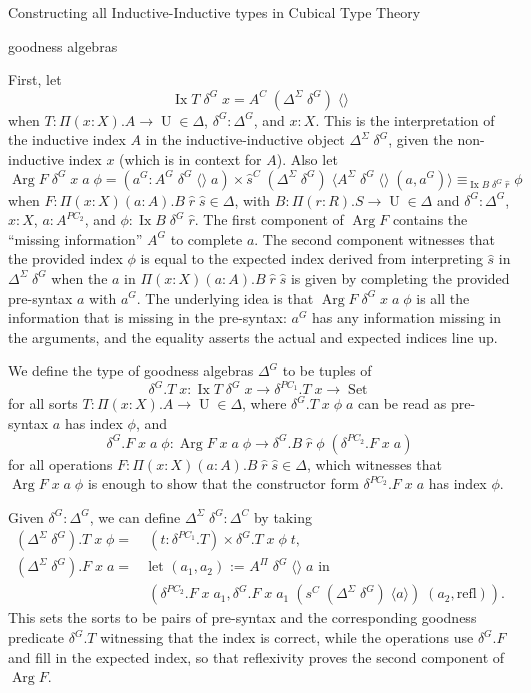 \documentclass[acmsmall,review]{acmart}\settopmatter{printfolios=true,printccs=false,printacmref=false}
\DeclareMathOperator{\USet}{Set}
\DeclareMathOperator{\UU}{U}
\DeclareMathOperator{\Arg}{Arg}
\DeclareMathOperator{\Ix}{Ix}
\newcommand{\IdA}[3]{{#1}\equiv_{#3}{#2}}
\def\emptytuple{\langle\rangle}
\begin{document}
\begin{section}{Constructing all Inductive-Inductive types in Cubical Type Theory}
\begin{subsection}{goodness algebras}
\begin{definition}
First, let \[\Ix T\;\delta^G\;x = A^C\;(\Delta^{\Sigma}\;\delta^G)\;\emptytuple\] when $T : \Pi(x : X).A \to \UU \in \Delta$, $\delta^G : \Delta^G$, and $x : X$. This is the interpretation of the inductive index $A$ in the inductive-inductive object $\Delta^\Sigma\;\delta^G$, given the non-inductive index $x$ (which is in context for $A$).
Also let \[\Arg F\;\delta^G\;x\;a\;\phi = (a^G : A^G\;\delta^G\;\emptytuple\;a)\times\IdA{\hat{s}^C\;(\Delta^{\Sigma}\;\delta^G)\;\langle A^{\Sigma}\;\delta^G\;\emptytuple\;(a,a^G)\rangle}{\phi}{\Ix B\;\delta^G\;\hat{r}}\] when $F : \Pi(x : X)(a:A).B\;\hat{r}\;\hat{s} \in \Delta$, with $B : \Pi(r : R).S\to\UU\in\Delta$ and $\delta^G : \Delta^G$, $x : X$, $a : A^{PC_2}$, and $\phi : \Ix B\;\delta^G\;\hat{r}$. The first component of $\Arg F$ contains the ``missing information'' $A^G$ to complete $a$. The second component witnesses that the provided index $\phi$ is equal to the expected index derived from interpreting $\hat{s}$ in $\Delta^\Sigma\;\delta^G$ when the $a$ in $\Pi(x : X)(a : A).B\;\hat{r}\;\hat{s}$ is given by completing the provided pre-syntax $a$ with $a^G$. The underlying idea is that $\Arg F\;\delta^G\;x\;a\;\phi$ is all the information that is missing in the pre-syntax: $a^G$ has any information missing in the arguments, and the equality asserts the actual and expected indices line up.

We define the type of goodness algebras $\Delta^G$ to be tuples of \[\delta^G.T\;x : \Ix T\;\delta^G\;x \to \delta^{PC_1}.T\;x \to \USet\] for all sorts $T : \Pi(x : X).A \to \UU \in \Delta$, where $\delta^G.T\;x\;\phi\;a$ can be read as pre-syntax $a$ has index $\phi$, and
\[\delta^G.F\;x\;a\;\phi : \Arg F\;x\;a\;\phi \to \delta^G.B\;\hat{r}\;\phi\;(\delta^{PC_2}.F\;x\;a)\] for all operations $F : \Pi(x : X)(a : A).B\;\hat{r}\;\hat{s} \in \Delta$, which witnesses that $\Arg F\;x\;a\;\phi$ is enough to show that the constructor form $\delta^{PC_2}.F\;x\;a$ has index $\phi$.

Given $\delta^G : \Delta^G$, we can define $\Delta^\Sigma\;\delta^G : \Delta^C$ by taking \begin{align*}(\Delta^\Sigma\;\delta^G).T\;x\;\phi =&\; (t : \delta^{PC_1}.T)\times \delta^G.T\;x\;\phi\;t,\\
(\Delta^\Sigma\;\delta^G).F\;x\;a =&\; \text{let $(a_1,a_2)$ := $A^{\Pi}\;\delta^G\;\emptytuple\;a$ in}\\&\;(\delta^{PC_2}.F\;x\;a_1, \delta^G.F\;x\;a_1\;(s^C\;(\Delta^\Sigma\;\delta^G)\;\langle a\rangle)\;(a_2,\text{refl})).\end{align*}
This sets the sorts to be pairs of pre-syntax and the corresponding goodness predicate $\delta^G.T$ witnessing that the index is correct, while the operations use $\delta^G.F$ and fill in the expected index, so that reflexivity proves the second component of $\Arg F$.


\end{definition}
\end{subsection}
\end{section}
\end{document}
